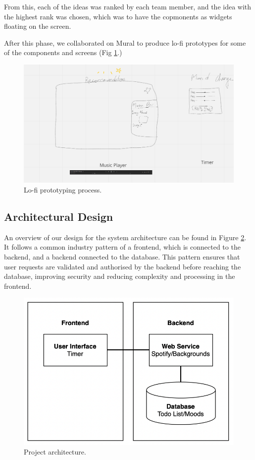 \documentclass[conference]{IEEEtran}
\begin{document}
From this, each of the ideas was ranked by each team member, and the idea with the highest rank was chosen, which was to have the copmonents as widgets floating on the screen.

After this phase, we collaborated on Mural to produce lo-fi prototypes for some of the components and screens (Fig \ref{prototyping}.)

\begin{figure}[htbp]
\centerline{\includegraphics[width = \linewidth]{prototyping.png}}
\caption{Lo-fi prototyping process.}
\label{prototyping}
\end{figure}

\subsection{Architectural Design}
An overview of our design for the system architecture can be found in Figure \ref{project-architecture}. It follows a common industry pattern of a frontend, which is connected to the backend, and a backend connected to the database. This pattern ensures that user requests are validated and authorised by the backend before reaching the database, improving security and reducing complexity and processing in the frontend.


\begin{figure}[htbp]
\centerline{\includegraphics[width = \linewidth]{project-architecture.png}}
\caption{Project architecture.}
\label{project-architecture}
\end{figure}
\end{document}
